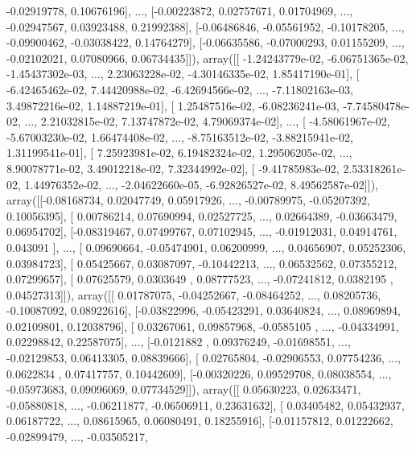 \documentclass{article}
\begin{document}
        -0.02919778,  0.10676196],
       ..., 
       [-0.00223872,  0.02757671,  0.01704969, ..., -0.02947567,
         0.03923488,  0.21992388],
       [-0.06486846, -0.05561952, -0.10178205, ..., -0.09900462,
        -0.03038422,  0.14764279],
       [-0.06635586, -0.07000293,  0.01155209, ..., -0.02102021,
         0.07080966,  0.06734435]]), array([[ -1.24243779e-02,  -6.06751365e-02,  -1.45437302e-03, ...,
          2.23063228e-02,  -4.30146335e-02,   1.85417190e-01],
       [ -6.42465462e-02,   7.44420988e-02,  -6.42694566e-02, ...,
         -7.11802163e-03,   3.49872216e-02,   1.14887219e-01],
       [  1.25487516e-02,  -6.08236241e-03,  -7.74580478e-02, ...,
          2.21032815e-02,   7.13747872e-02,   4.79069374e-02],
       ..., 
       [ -4.58061967e-02,  -5.67003230e-02,   1.66474408e-02, ...,
         -8.75163512e-02,  -3.88215941e-02,   1.31199541e-01],
       [  7.25923981e-02,   6.19482324e-02,   1.29506205e-02, ...,
          8.90078771e-02,   3.49012218e-02,   7.32344992e-02],
       [ -9.41785983e-02,   2.53318261e-02,   1.44976352e-02, ...,
         -2.04622660e-05,  -6.92826527e-02,   8.49562587e-02]]), array([[-0.08168734,  0.02047749,  0.05917926, ..., -0.00789975,
        -0.05207392,  0.10056395],
       [ 0.00786214,  0.07690994,  0.02527725, ...,  0.02664389,
        -0.03663479,  0.06954702],
       [-0.08319467,  0.07499767,  0.07102945, ..., -0.01912031,
         0.04914761,  0.043091  ],
       ..., 
       [ 0.09690664, -0.05474901,  0.06200999, ...,  0.04656907,
         0.05252306,  0.03984723],
       [ 0.05425667,  0.03087097, -0.10442213, ...,  0.06532562,
         0.07355212,  0.07299657],
       [ 0.07625579,  0.0303649 ,  0.08777523, ..., -0.07241812,
         0.0382195 ,  0.04527313]]), array([[ 0.01787075, -0.04252667, -0.08464252, ...,  0.08205736,
        -0.10087092,  0.08922616],
       [-0.03822996, -0.05423291,  0.03640824, ...,  0.08969894,
         0.02109801,  0.12038796],
       [ 0.03267061,  0.09857968, -0.0585105 , ..., -0.04334991,
         0.02298842,  0.22587075],
       ..., 
       [-0.0121882 ,  0.09376249, -0.01698551, ..., -0.02129853,
         0.06413305,  0.08839666],
       [ 0.02765804, -0.02906553,  0.07754236, ...,  0.0622834 ,
         0.07417757,  0.10442609],
       [-0.00320226,  0.09529708,  0.08038554, ..., -0.05973683,
         0.09096069,  0.07734529]]), array([[ 0.05630223,  0.02633471, -0.05880818, ..., -0.06211877,
        -0.06506911,  0.23631632],
       [ 0.03405482,  0.05432937,  0.06187722, ...,  0.08615965,
         0.06080491,  0.18255916],
       [-0.01157812,  0.01222662, -0.02899479, ..., -0.03505217,
\end{document}
